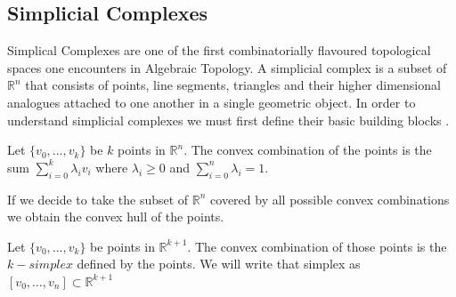 \subsection{Simplicial Complexes}

Simplical Complexes are one of the first combinatorially flavoured topological spaces one encounters in Algebraic Topology. A simplicial complex is a subset of $\mathbb{R}^n$ that consists of points, line segments, triangles and their higher dimensional analogues attached to one another in a single geometric object. In order to understand simplicial complexes we must first define their basic building blocks \cite[p. 51]{comp-topo}.

\begin{defn} Let $\{v_0, ..., v_k\}$ be $k$ points in $\mathbb{R}^n$. The convex combination of the points is the sum $\sum_{i=0}^k{\lambda_iv_i}$ where $\lambda_i \ge 0$ and $\sum_{i=0}^n{\lambda_i} = 1$.  \end{defn}

If we decide to take the subset of $\mathbb{R}^n$ covered by all possible convex combinations we obtain the convex hull of the points.

\begin{defn} Let $\{v_0, ..., v_k\}$ be points in $\mathbb{R}^{k+1}$. The convex combination of those points is the $k-simplex$ defined by the points. We will write that simplex as $[v_0, ..., v_n] \subset \mathbb{R}^{k+1}$  \end{defn}

